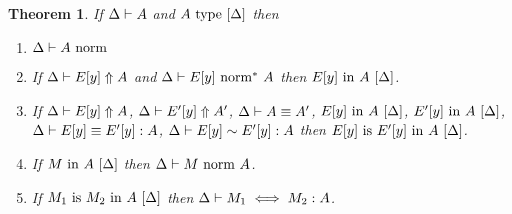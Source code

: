 \documentclass{article}
\theoremstyle{break}
\newtheorem{theorem}{Theorem}
\begin{document}
\begin{theorem}
\label{maintheorem}
If $\Delta\vdash A$ and ${A}\mathrm{\ type\ }[\Delta]$ then
\begin{enumerate}
\item 
\label{ih-1}
${\Delta}\vdash{A}\mbox{\ norm}$
\item
\label{ih-2}
If $\Delta\vdash E[y] \Uparrow A$
and ${\Delta}\vdash{E[y]}\mbox{\ norm}^*\ {A}$ then
${E[y]}\mathrm{\ in\ }{A}\ [\Delta]$.
\item
\label{ih-3}
If $\Delta\vdash E[y] \Uparrow A$,
$\Delta\vdash E'[y] \Uparrow A'$,
$\Delta\vdash A \equiv A'$,
${E[y]}\mathrm{\ in\ }{A}\ [\Delta]$,
${E'[y]}\mathrm{\ in\ }{A}\ [\Delta]$,
$\Delta\vdash E[y] \equiv E'[y] : A$,
$\Delta\vdash E[y] \sim E'[y] : A$ then
${E[y]}\mathrm{\ is\ }{E'[y]}\mathrm{\ in\ }{A}\ [\Delta]$.
\item
\label{ih-4}
If ${M}\mathrm{\ in\ }{A}\ [\Delta]$ then
${\Delta}\vdash{M}\mbox{\ norm\ }{A}$.
\item
\label{ih-5}
If ${M_1}\mathrm{\ is\ }{M_2}\mathrm{\ in\ }{A}\ [\Delta]$ then
$\Delta\vdash M_1 \iff M_2 : A$.
\end{enumerate}
\end{theorem}
\end{document}
